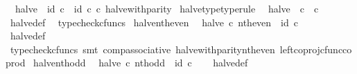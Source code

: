 \begin{isabellebody}
\ \ {\isachardoublequoteopen}halve\ {\isacharequal}{\kern0pt}\ {\isacharparenleft}{\kern0pt}id\ {\isasymnat}\isactrlsub c\ {\isasymamalg}\ id\ {\isasymnat}\isactrlsub c{\isacharparenright}{\kern0pt}\ {\isasymcirc}\isactrlsub c\ halve{\isacharunderscore}{\kern0pt}with{\isacharunderscore}{\kern0pt}parity{\isachardoublequoteclose}\isanewline
\isanewline
{}\isamarkupfalse%
\ halve{\isacharunderscore}{\kern0pt}type{\isacharbrackleft}{\kern0pt}type{\isacharunderscore}{\kern0pt}rule{\isacharbrackright}{\kern0pt}{\isacharcolon}{\kern0pt}\isanewline
\ \ {\isachardoublequoteopen}halve\ {\isacharcolon}{\kern0pt}\ {\isasymnat}\isactrlsub c\ {\isasymrightarrow}\ {\isasymnat}\isactrlsub c{\isachardoublequoteclose}\isanewline
%
\isadelimproof
\ \ %
\endisadelimproof
%
\isatagproof
{}\isamarkupfalse%
\ halve{\isacharunderscore}{\kern0pt}def\ \isamarkupfalse%
\ typecheck{\isacharunderscore}{\kern0pt}cfuncs%
\endisatagproof
{\isafoldproof}%
%
\isadelimproof
\isanewline
%
\endisadelimproof
\isanewline
{}\isamarkupfalse%
\ halve{\isacharunderscore}{\kern0pt}nth{\isacharunderscore}{\kern0pt}even{\isacharcolon}{\kern0pt}\isanewline
\ \ {\isachardoublequoteopen}halve\ {\isasymcirc}\isactrlsub c\ nth{\isacharunderscore}{\kern0pt}even\ {\isacharequal}{\kern0pt}\ id\ {\isasymnat}\isactrlsub c{\isachardoublequoteclose}\isanewline
%
\isadelimproof
\ \ %
\endisadelimproof
%
\isatagproof
{}\isamarkupfalse%
\ halve{\isacharunderscore}{\kern0pt}def\ \isamarkupfalse%
\ {\isacharparenleft}{\kern0pt}typecheck{\isacharunderscore}{\kern0pt}cfuncs{\isacharcomma}{\kern0pt}\ smt\ comp{\isacharunderscore}{\kern0pt}associative{}\ halve{\isacharunderscore}{\kern0pt}with{\isacharunderscore}{\kern0pt}parity{\isacharunderscore}{\kern0pt}nth{\isacharunderscore}{\kern0pt}even\ left{\isacharunderscore}{\kern0pt}coproj{\isacharunderscore}{\kern0pt}cfunc{\isacharunderscore}{\kern0pt}coprod{\isacharparenright}{\kern0pt}%
\endisatagproof
{\isafoldproof}%
%
\isadelimproof
\isanewline
%
\endisadelimproof
\isanewline
{}\isamarkupfalse%
\ halve{\isacharunderscore}{\kern0pt}nth{\isacharunderscore}{\kern0pt}odd{\isacharcolon}{\kern0pt}\isanewline
\ \ {\isachardoublequoteopen}halve\ {\isasymcirc}\isactrlsub c\ nth{\isacharunderscore}{\kern0pt}odd\ {\isacharequal}{\kern0pt}\ id\ {\isasymnat}\isactrlsub c{\isachardoublequoteclose}\isanewline
%
\isadelimproof
\ \ %
\endisadelimproof
%
\isatagproof
{}\isamarkupfalse%
\ halve{\isacharunderscore}{\kern0pt}def\ \isamarkupfalse%

\end{isabellebody}
